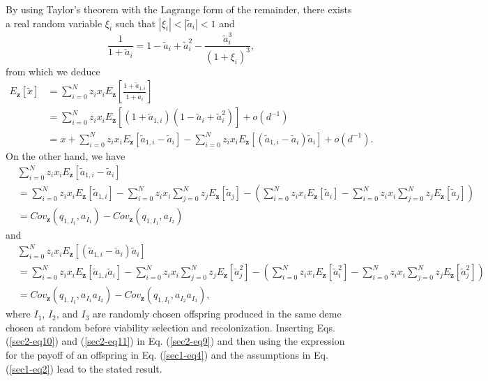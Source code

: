 \documentclass[11pt]{article}
\begin{document}
By using Taylor's theorem with the Lagrange form of the remainder, there exists a real random variable $\xi_i$ such that $|\xi_i|<|\tilde{a}_{i}|< 1$ and
\begin{equation}\label{sec2-eq8}
\frac{1}{1+\tilde{a}_{i}}=1-\tilde{a}_{i}+\tilde{a}_{i}^2-\frac{\tilde{a}_{i}^3}{(1+\xi_i)^{3}},
\end{equation}
from which we deduce 
\begin{align}\label{sec2-eq9}
E_{\mathbf{z}}\left[\tilde{x}\right]&=\sum_{i=0}^{N}z_ix_iE_{\mathbf{z}}\left[\frac{1+\tilde{a}_{1,i}}{1+\tilde{a}_{i}}\right]\nonumber\\
&=\sum_{i=0}^{N}z_ix_iE_{\mathbf{z}}\left[\left(1+\tilde{a}_{1,i}\right)\left(1-\tilde{a}_{i}+\tilde{a}_{i}^2\right)\right]+o(d^{-1})\nonumber\\
&=x+\sum_{i=0}^{N}z_ix_iE_{\mathbf{z}}\left[\tilde{a}_{1,i}-\tilde{a}_{i}\right]-\sum_{i=0}^{N}z_ix_iE_{\mathbf{z}}\left[\left(\tilde{a}_{1,i}-\tilde{a}_{i}\right)\tilde{a}_{i}\right]+o(d^{-1}).
\end{align}
On the other hand, we have 
\begin{align}\label{sec2-eq10}
&\sum_{i=0}^{N}z_ix_iE_{\mathbf{z}}\left[\tilde{a}_{1,i}-\tilde{a}_{i}\right]\nonumber\\
&=\sum_{i=0}^{N}z_ix_iE_{\mathbf{z}}\left[\tilde{a}_{1,i}\right]
-\sum_{i=0}^{N}z_ix_i\sum_{j=0}^{N}z_jE_{\mathbf{z}}\left[\tilde{a}_{j}\right]-
\left(
\sum_{i=0}^{N}z_ix_iE_{\mathbf{z}}\left[\tilde{a}_{i}\right]
-\sum_{i=0}^{N}z_ix_i\sum_{j=0}^{N}z_jE_{\mathbf{z}}\left[\tilde{a}_{j}\right]
\right)\nonumber\\
&=Cov_{\mathbf{z}}(q_{1,I_1},a_{I_1})-Cov_{\mathbf{z}}(q_{1,I_1},a_{I_2})
\end{align}
and
\begin{align}\label{sec2-eq11}
&\sum_{i=0}^{N}z_ix_iE_{\mathbf{z}}\left[\left(\tilde{a}_{1,i}-\tilde{a}_{i}\right)\tilde{a}_{i}\right]\nonumber\\
&=\sum_{i=0}^{N}z_ix_iE_{\mathbf{z}}\left[\tilde{a}_{1,i}\tilde{a}_{i}\right]-\sum_{i=0}^{N}z_ix_i\sum_{j=0}^{N}z_jE_{\mathbf{z}}\left[\tilde{a}_{j}^2\right]-
\left(
\sum_{i=0}^{N}z_ix_iE_{\mathbf{z}}\left[\tilde{a}_{i}^2\right]
-
\sum_{i=0}^{N}z_ix_i\sum_{j=0}^{N}z_jE_{\mathbf{z}}\left[\tilde{a}_{j}^2\right]
\right)\nonumber\\
&=Cov_{\mathbf{z}}(q_{1,I_1},a_{I_1}a_{I_2})-Cov_{\mathbf{z}}(q_{1,I_1},a_{I_2}a_{I_3}),
\end{align}
where $I_1$, $I_2$, and $I_3$ are randomly chosen offspring produced in the same deme chosen at random before viability selection and recolonization.
Inserting Eqs. (\ref{sec2-eq10}) and (\ref{sec2-eq11}) in  Eq. (\ref{sec2-eq9}) and then using the expression for the payoff of an offspring in Eq. (\ref{sec1-eq4}) and the assumptions in Eq. (\ref{sec1-eq2}) lead to the stated result.
\end{document}
